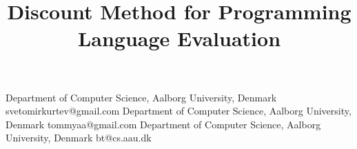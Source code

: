\documentclass[10pt]{sigplanconf}
\begin{document}
\toappear{} 

\setlength{\pdfpageheight}{\paperheight}
\setlength{\pdfpagewidth}{\paperwidth}




\title{Discount Method for Programming Language Evaluation}

           {Department of Computer Science, Aalborg University, Denmark}
           {svetomirkurtev@gmail.com}
           {Department of Computer Science, Aalborg University, Denmark}
           {tommyaa@gmail.com}
           {Department of Computer Science, Aalborg University, Denmark}
           {bt@cs.aau.dk}          

\maketitle
\end{document}
